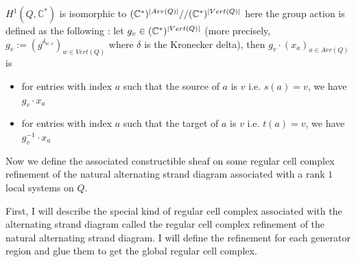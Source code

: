$H^1(Q,\mathbb{C}^*)$ is isomorphic to $(\mathbb{C}^*)^{|Arr(Q)|}//(\mathbb{C}^*)^{|Vert(Q)|}$
here the group action is defined as the following : let $g_v \in (\mathbb{C}^*)^{|Vert(Q)|}$
(more precisely, $g_v := (g^{\delta_{w,v}})_{w \in Vert(Q)}$ where $\delta$ is the Kronecker delta),
then $g_v \cdot (x_a)_{a\in Arr(Q)}$ is 

\begin{itemize}
\item for entries with index $a$ such that the source of $a$ is $v$ i.e. $s(a) = v$, we have $g_v \cdot x_a$
\item for entries with index $a$ such that the target of $a$ is $v$ i.e. $t(a) = v$, we have $g_v^{-1} \cdot x_a$
\end{itemize}


Now we define the associated constructible sheaf on some regular cell complex refinement of the natural alternating strand diagram associated with a rank $1$ local systems on $Q$.

First, I will describe the special kind of regular cell complex associated with the alternating strand diagram called the regular cell complex refinement of the natural alternating strand diagram. I will define the refinement for each generator region and glue them to get the global regular cell complex.

